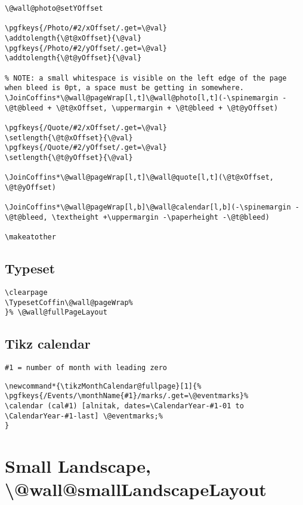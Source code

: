 \documentclass[11pt,oneside]{memoir-article}
\begin{document}
\begin{verbatim}
\@wall@photo@setYOffset

\pgfkeys{/Photo/#2/xOffset/.get=\@val}
\addtolength{\@t@xOffset}{\@val}
\pgfkeys{/Photo/#2/yOffset/.get=\@val}
\addtolength{\@t@yOffset}{\@val}

% NOTE: a small whitespace is visible on the left edge of the page when bleed is 0pt, a space must be getting in somewhere.
\JoinCoffins*\@wall@pageWrap[l,t]\@wall@photo[l,t](-\spinemargin -\@t@bleed + \@t@xOffset, \uppermargin + \@t@bleed + \@t@yOffset)

\pgfkeys{/Quote/#2/xOffset/.get=\@val}
\setlength{\@t@xOffset}{\@val}
\pgfkeys{/Quote/#2/yOffset/.get=\@val}
\setlength{\@t@yOffset}{\@val}

\JoinCoffins*\@wall@pageWrap[l,t]\@wall@quote[l,t](\@t@xOffset, \@t@yOffset)

\JoinCoffins*\@wall@pageWrap[l,b]\@wall@calendar[l,b](-\spinemargin -\@t@bleed, \textheight +\uppermargin -\paperheight -\@t@bleed)

\makeatother
\end{verbatim}

\subsection{Typeset}
\label{sec:org8ecab35}

\begin{verbatim}
\clearpage
\TypesetCoffin\@wall@pageWrap%
}% \@wall@fullPageLayout
\end{verbatim}

\subsection{Tikz calendar}
\label{sec:org9d8ff59}

\begin{verbatim}
#1 = number of month with leading zero
\end{verbatim}

\begin{verbatim}
\newcommand*{\tikzMonthCalendar@fullpage}[1]{%
\pgfkeys{/Events/\monthName{#1}/marks/.get=\@eventmarks}%
\calendar (cal#1) [alnitak, dates=\CalendarYear-#1-01 to \CalendarYear-#1-last] \@eventmarks;%
}
\end{verbatim}

\section{Small Landscape, \textbackslash @wall@smallLandscapeLayout}
\label{sec:orgffb1874}
\end{document}
